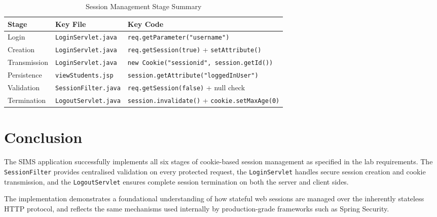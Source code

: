 \documentclass[12pt, a4paper]{article}
\begin{document}
\begin{table}[H]
\centering
\renewcommand{\arraystretch}{1.4}
\begin{tabularx}{\textwidth}{llX}
\toprule
\textbf{Stage} & \textbf{Key File} & \textbf{Key Code} \\
\midrule
Login        & \texttt{LoginServlet.java}   & \texttt{req.getParameter("username")} \\
Creation     & \texttt{LoginServlet.java}   & \texttt{req.getSession(true)} +
                                             \texttt{setAttribute()} \\
Transmission & \texttt{LoginServlet.java}   & \texttt{new Cookie("sessionid", session.getId())} \\
Persistence  & \texttt{viewStudents.jsp}    & \texttt{session.getAttribute("loggedInUser")} \\
Validation   & \texttt{SessionFilter.java}  & \texttt{req.getSession(false)} + null check \\
Termination  & \texttt{LogoutServlet.java}  & \texttt{session.invalidate()} +
                                             \texttt{cookie.setMaxAge(0)} \\
\bottomrule
\end{tabularx}
\caption{Session Management Stage Summary}
\end{table}

\section{Conclusion}

The SIMS application successfully implements all six stages of cookie-based
session management as specified in the lab requirements. The
\texttt{SessionFilter} provides centralised validation on every protected
request, the \texttt{LoginServlet} handles secure session creation and cookie
transmission, and the \texttt{LogoutServlet} ensures complete session
termination on both the server and client sides.

The implementation demonstrates a foundational understanding of how stateful
web sessions are managed over the inherently stateless HTTP protocol, and
reflects the same mechanisms used internally by production-grade frameworks
such as Spring Security.
\end{document}
